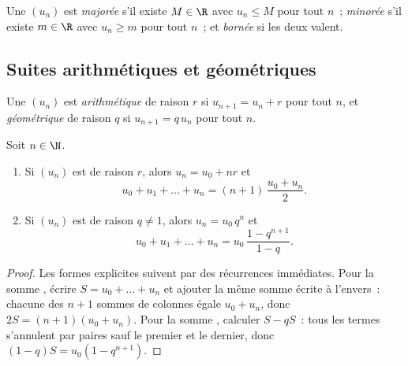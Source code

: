 \begin{definition}\label{def:g12:seq:bounded}
Une  $(u_n)$ est \emph{majorée} s'il existe
$M \in \R$ avec $u_n \leq M$ pour tout $n$~; \emph{minorée} s'il existe
$m \in \R$ avec $u_n \geq m$ pour tout $n$~; et \emph{bornée} si les deux
valent.
\end{definition}

\subsection{Suites arithmétiques et géométriques}

\begin{definition}\label{def:g12:seq:arith-geom}
Une  $(u_n)$ est \emph{arithmétique} de
raison $r$ si $u_{n+1} = u_n + r$ pour tout $n$, et
\emph{géométrique} de raison $q$ si
$u_{n+1} = q\,u_n$ pour tout $n$.
\end{definition}

\begin{proposition}\label{prop:g12:seq:arith-geom}
Soit $n \in \N$.
\begin{enumerate}
  \item Si $(u_n)$ est  de raison $r$, alors
        $u_n = u_0 + nr$ et
        \[
        u_0 + u_1 + \dots + u_n = (n+1)\,\frac{u_0 + u_n}{2}.
        \]
  \item Si $(u_n)$ est  de raison $q \neq 1$, alors
        $u_n = u_0\, q^n$ et
        \[
        u_0 + u_1 + \dots + u_n = u_0\,\frac{1 - q^{n+1}}{1 - q}.
        \]
\end{enumerate}
\end{proposition}

\begin{proof}
Les formes explicites suivent par des récurrences immédiates. Pour la
somme , écrire $S = u_0 + \dots + u_n$ et ajouter la même
somme écrite à l'envers~: chacune des $n+1$ sommes de colonnes égale
$u_0 + u_n$, donc $2S = (n+1)(u_0+u_n)$. Pour la somme ,
calculer $S - qS$~: tous les termes s'annulent par paires sauf le premier
et le dernier, donc $(1-q)S = u_0(1 - q^{n+1})$.
\end{proof}

